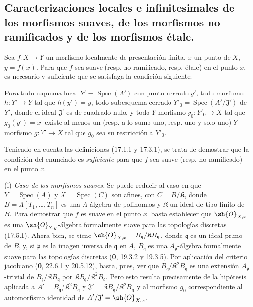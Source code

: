 \subsection{Caracterizaciones locales e infinitesimales de los morfismos suaves, de los morfismos no ramificados y de los morfismos étale.}
\label{subsection:IV.17.14}

\begin{proposition}[17.14.1]
\label{IV.17.14.1}
Sea $f:X\to Y$ un morfismo localmente de presentación finita, $x$ un punto de $X$, $y=f(x)$. Para que $f$ sea suave \textup{(resp.} no ramificado, \textup{resp.} étale\textup{)} en el punto $x$, es necesario y suficiente que se satisfaga la condición siguiente:

Para todo \textup{esquema local} $Y'=\operatorname{Spec}(A')$ con punto cerrado $y'$, todo morfismo $h:Y'\to Y$ tal que $h(y')=y$, todo subesquema cerrado $Y'_0=\operatorname{Spec}(A'/\mathfrak{J}')$ de $Y'$, donde el ideal $\mathfrak{J}'$ es de cuadrado nulo, y todo $Y$-morfismo $g_0:Y'_0\to X$ tal que $g_0(y')=x$, existe al menos un \textup{(resp.} a lo sumo uno, \textup{resp.} uno y solo uno\textup{)} $Y$-morfismo $g:Y'\to X$ tal que $g_0$ sea su restricción a $Y'_0$.
\end{proposition}

Teniendo en cuenta las definiciones (17.1.1 y 17.3.1), se trata de demostrar que la condición del enunciado es \emph{suficiente} para que $f$ sea suave (resp. no ramificado) en el punto $x$.

(i) \emph{Caso de los morfismos suaves.} Se puede reducir al caso en que $Y=\operatorname{Spec}(A)$ y $X=\operatorname{Spec}(C)$ son afines, con $C=B/\mathfrak{K}$, donde $B=A[T_1,\ldots,T_n]$ es una $A$-álgebra de polinomios y $\mathfrak{K}$ un ideal de tipo finito de $B$. Para demostrar que $f$ es suave en el punto $x$, basta establecer que $\sh{O}_{X,x}$ es una $\sh{O}_{Y,y}$-álgebra formalmente suave para las topologías discretas (17.5.1). Ahora bien, se tiene $\sh{O}_{X,x}=B_{\mathfrak q}/\mathfrak{K}B_{\mathfrak q}$, donde $\mathfrak q$ es un ideal primo de $B$, y, si $\mathfrak p$ es la imagen inversa de $\mathfrak q$ en $A$, $B_{\mathfrak q}$ es una $A_{\mathfrak p}$-álgebra formalmente suave para las topologías discretas (\textbf 0, 19.3.2 y 19.3.5). Por aplicación del criterio jacobiano (\textbf 0, 22.6.1 y 20.5.12), basta, pues, ver que $B_{\mathfrak q}/\mathfrak{K}^2B_{\mathfrak q}$ es una extensión $A_{\mathfrak p}$-trivial de $B_{\mathfrak q}/\mathfrak{K}B_{\mathfrak q}$ por $\mathfrak{K}B_{\mathfrak q}/\mathfrak{K}^2B_{\mathfrak q}$. Pero esto resulta precisamente de la hipótesis aplicada a $A'=B_{\mathfrak q}/\mathfrak{K}^2B_{\mathfrak q}$ y $\mathfrak{J}'=\mathfrak{K}B_{\mathfrak q}/\mathfrak{K}^2B_{\mathfrak q}$ y al morfismo $g_0$ correspondiente al automorfismo identidad de $A'/\mathfrak{J}'=\sh{O}_{X,x}$.

